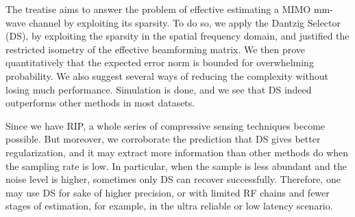 
\startchapter [title={Conclusion}]

The treatise aims to answer the problem of effective estimating a MIMO mm-wave channel by exploiting its sparsity.
To do so, we apply the Dantzig Selector (DS), by exploiting the sparsity in the spatial frequency domain, and justified the restricted isometry of the effective beamforming matrix.
We then prove quantitatively that the expected error norm is bounded for overwhelming probability.
We also suggest several ways of reducing the complexity without losing much performance.
Simulation is done, and we see that DS indeed outperforms other methods in most datasets.

Since we have RIP, a whole series of compressive sensing techniques become possible.
But moreover, we corroborate the prediction that DS gives better regularization, and it may extract more information than other methods do when the sampling rate is low.
In particular, when the sample is less abundant and the noise level is higher, sometimes only DS can recover successfully.
Therefore, one may use DS for sake of higher precision, or with limited RF chains and fewer stages of estimation, for example, in the ultra reliable or low latency scenario.

\stopchapter


